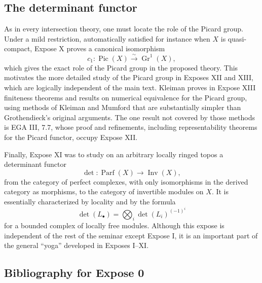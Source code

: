\documentclass[14pt]{extarticle}
\newcommand{\Gr}{\operatorname{Gr}}
\newcommand{\Pic}{\operatorname{Pic}}
\newcommand{\Parf}{\operatorname{Parf}}
\newcommand{\Inv}{\operatorname{Inv}}
\newcommand{\detn}{\operatorname{det}}
\begin{document}
\subsection{The determinant functor}

As in every intersection theory, one must locate the role of the Picard group. Under a mild restriction, automatically satisfied for instance when $X$ is quasi-compact, Expose X proves a canonical isomorphism
\[
   c_1:\Pic(X)\xrightarrow{\sim}\Gr^1(X),
\]
which gives the exact role of the Picard group in the proposed theory. This motivates the more detailed study of the Picard group in Exposes XII and XIII, which are logically independent of the main text. Kleiman proves in Expose XIII finiteness theorems and results on numerical equivalence for the Picard group, using methods of Kleiman and Mumford that are substantially simpler than Grothendieck's original arguments. The one result not covered by those methods is EGA III, 7.7, whose proof and refinements, including representability theorems for the Picard functor, occupy Expose XII.

Finally, Expose XI was to study on an arbitrary locally ringed topos a determinant functor
\[
   \detn:\Parf(X)\to\Inv(X),
\]
from the category of perfect complexes, with only isomorphisms in the derived category as morphisms, to the category of invertible modules on $X$. It is essentially characterized by locality and by the formula
\[
   \detn(L_{\bullet})=\bigotimes_i \det(L_i)^{(-1)^i}
\]
for a bounded complex of locally free modules. Although this expose is independent of the rest of the seminar except Expose I, it is an important part of the general ``yoga'' developed in Exposes I--XI.

\subsection*{Bibliography for Expose 0}
\end{document}
